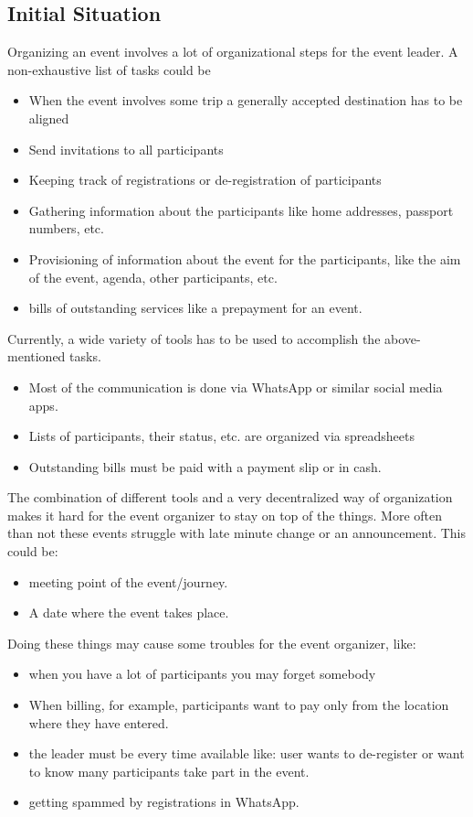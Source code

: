 \documentclass[12pt]{article}
\theoremstyle{definition}
\begin{document}
\subsection{Initial Situation}
Organizing an event involves a lot of organizational steps for the event leader. A non-exhaustive list of tasks could be
\begin{itemize}
\item When the event involves some trip a generally accepted destination has to be aligned
\item Send invitations to all participants
\item Keeping track of registrations or de-registration of participants
\item Gathering information about the participants like home addresses, passport numbers, etc.
\item Provisioning of information about the event for the participants, like the aim of the event, agenda, other participants, etc.
\item bills of outstanding services like a prepayment for an event.
\end{itemize}

Currently, a wide variety of tools has to be used to accomplish the above-mentioned tasks.
\begin{itemize}
\item Most of the communication is done via WhatsApp or similar social media apps.
\item Lists of participants, their status, etc. are organized via spreadsheets
\item Outstanding bills must be paid with a payment slip or in cash.
\end{itemize}


The combination of different tools and a very decentralized way of organization makes it hard for the event organizer to stay on top of the things. More often than not these events struggle with late minute change or an announcement.  This could be:
\begin{itemize}
\item meeting point of the event/journey.
\item A date where the event takes place.
\end{itemize}


Doing these things may cause some troubles for the event organizer, like:

\begin{itemize}
\item when you have a lot of participants you may forget somebody
\item When billing, for example, participants want to pay only from the location where they have entered.
\item the leader must be every time available like: user wants to de-register or want to know many participants take part in the event.
\item getting spammed by registrations in WhatsApp.  
\end{itemize}
\end{document}
